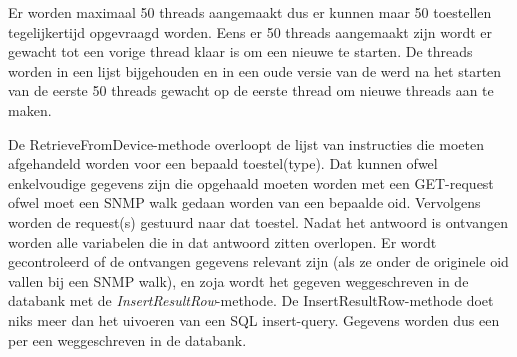 Er worden maximaal 50 threads aangemaakt dus er kunnen maar 50 toestellen tegelijkertijd opgevraagd worden.
Eens er 50 threads aangemaakt zijn wordt er gewacht tot een vorige thread klaar is om een nieuwe te starten.
De threads worden in een lijst bijgehouden en in een oude versie van de \nwmretriever{} werd na het starten van de eerste 50 threads gewacht op
de eerste thread om nieuwe threads aan te maken.

De RetrieveFromDevice-methode overloopt de lijst van instructies die moeten afgehandeld worden voor een bepaald toestel(type).
Dat kunnen ofwel enkelvoudige gegevens zijn die opgehaald moeten worden met een GET-request ofwel moet een SNMP walk gedaan worden van een bepaalde \gls{oid}.
Vervolgens worden de request(s) gestuurd naar dat toestel.
Nadat het antwoord is ontvangen worden alle variabelen die in dat antwoord zitten overlopen.
Er wordt gecontroleerd of de ontvangen gegevens relevant zijn (als ze onder de originele \gls{oid} vallen bij een SNMP walk),
en zoja wordt het gegeven weggeschreven in de databank met de \textit{InsertResultRow}-methode.
De InsertResultRow-methode doet niks meer dan het uivoeren van een SQL insert-query.
Gegevens worden dus een per een weggeschreven in de databank.

